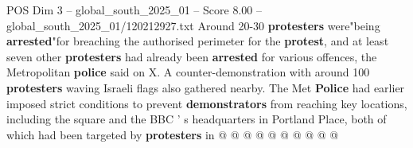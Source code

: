 \begin{textsample}{POS Dim 3 – global\_south\_2025\_01 – Score 8.00 – global\_south\_2025\_01/120212927.txt}
Around 20-30 \textbf{protesters} were"being \textbf{arrested}"for breaching the authorised perimeter for the \textbf{protest}, and at least seven other \textbf{protesters} had already been \textbf{arrested} for various offences, the Metropolitan \textbf{police} said on X.
A counter-demonstration with around 100 \textbf{protesters} waving Israeli flags also gathered nearby.
The Met \textbf{Police} had earlier imposed strict conditions to prevent \textbf{demonstrators} from reaching key locations, including the square and the BBC ' s headquarters in Portland Place, both of which had been targeted by \textbf{protesters} in @ @ @ @ @ @ @ @ @ @

\end{textsample}

